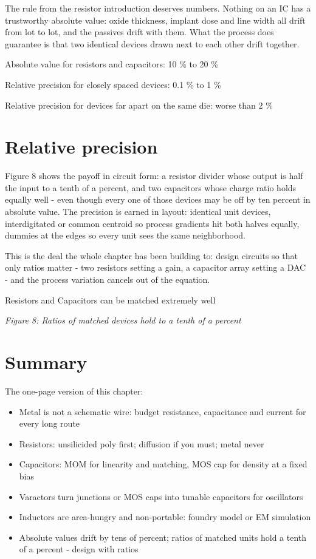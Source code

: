 The rule from the resistor introduction deserves numbers. Nothing on an
IC has a trustworthy absolute value: oxide thickness, implant dose and
line width all drift from lot to lot, and the passives drift with them.
What the process does guarantee is that two identical devices drawn next
to each other drift together.

Absolute value for resistors and capacitors: 10 \% to 20 \%

Relative precision for closely spaced devices: 0.1 \% to 1 \%

Relative precision for devices far apart on the same die: worse than 2
\%

\section{Relative precision}\label{relative-precision}

Figure 8 shows the payoff in circuit form: a resistor divider whose
output is half the input to a tenth of a percent, and two capacitors
whose charge ratio holds equally well - even though every one of those
devices may be off by ten percent in absolute value. The precision is
earned in layout: identical unit devices, interdigitated or common
centroid so process gradients hit both halves equally, dummies at the
edges so every unit sees the same neighborhood.

This is the deal the whole chapter has been building to: design circuits
so that only ratios matter - two resistors setting a gain, a capacitor
array setting a DAC - and the process variation cancels out of the
equation.

Resistors and Capacitors can be matched extremely well


{
\centering
{}
}

\emph{Figure 8: Ratios of matched devices hold to a tenth of a percent}

\section{Summary}\label{summary}

The one-page version of this chapter:

\begin{itemize}
\tightlist
\item
  Metal is not a schematic wire: budget resistance, capacitance and
  current for every long route
\item
  Resistors: unsilicided poly first; diffusion if you must; metal never
\item
  Capacitors: MOM for linearity and matching, MOS cap for density at a
  fixed bias
\item
  Varactors turn junctions or MOS caps into tunable capacitors for
  oscillators
\item
  Inductors are area-hungry and non-portable: foundry model or EM
  simulation
\item
  Absolute values drift by tens of percent; ratios of matched units hold
  a tenth of a percent - design with ratios
\end{itemize}

